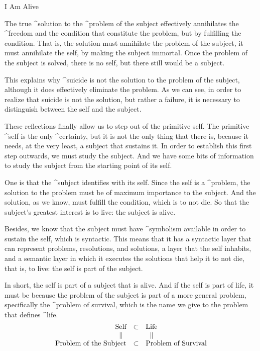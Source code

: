 \Section I Am Alive

The true ^{solution} to the ^{problem of the subject} effectively
annihilates the ^{freedom} and the condition that constitute the
problem, but by fulfilling the condition. That is, the solution must
annihilate the problem of the subject, it must annihilate the self, by
making the subject immortal. Once the problem of the subject is solved,
there is no self, but there still would be a subject.

This explains why ^{suicide} is not the solution to the problem of the
subject, although it does effectively eliminate the problem. As we can
see, in order to realize that suicide is not the solution, but rather a
failure, it is necessary to distinguish between the self and the
subject.

These reflections finally allow us to step out of the primitive self.
The primitive ^{self} is the only ^{certainty}, but it is not the only
thing that there is, because it needs, at the very least, a subject that
sustains it. In order to establish this first step outwards, we must
study the subject. And we have some bits of information to study the
subject from the starting point of its self.

One is that the ^{subject} identifies with its self. Since the self is a
^{problem}, the solution to the problem must be of maximum importance to
the subject. And the solution, as we know, must fulfill the condition,
which is to not die. So that the subject's greatest interest is to live:
the subject is alive.

Besides, we know that the subject must have ^{symbolism} available in
order to sustain the self, which is syntactic. This means that it has a
syntactic layer that can represent problems, resolutions, and solutions,
a layer that the self inhabits, and a semantic layer in which it
executes the solutions that help it to not die, that is, to live: the
self is part of the subject.

In short, the self is part of a subject that is alive. And if the self
is part of life, it must be because the problem of the subject is part
of a more general problem, specifically the ^{problem of survival},
which is the name we give to the problem that defines ^{life}.
$$\vbox{\halign{\hfil#&\quad\hfil#\hfil\quad&#\hfil\cr
 \vtop{\halign{\hfil#\hfil\cr Self\cr $\parallel$\cr}}& %
 $\subset$&
 \vtop{\halign{\hfil#\hfil\cr Life\cr $\parallel$\cr}}\cr
 \strut Problem of the Subject&
 $\subset$&
 Problem of Survival\cr}}$$


